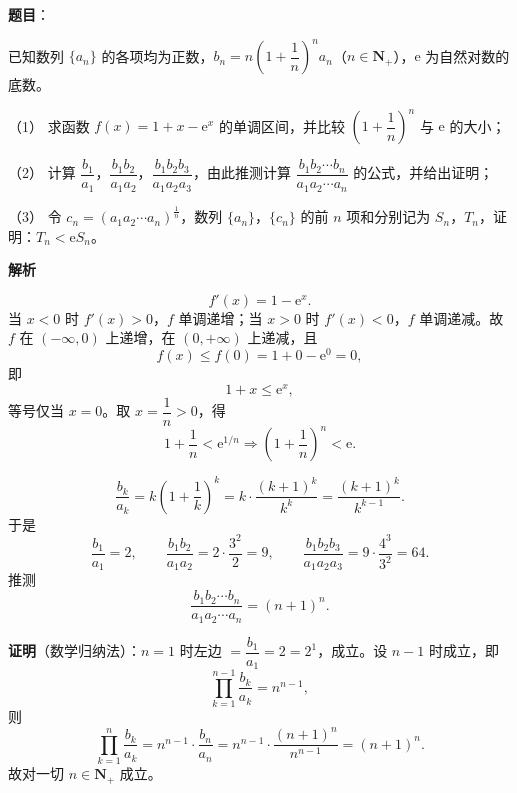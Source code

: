 \begin{answer}

\textbf{题目}：

已知数列 \(\{a_n\}\) 的各项均为正数，\(b_n=n\left(1+\dfrac{1}{n}\right)^n a_n\)（\(n\in\mathbf{N}_+\)），\(\mathrm{e}\) 为自然对数的底数。

（1） 求函数 \(f(x)=1+x-\mathrm{e}^x\) 的单调区间，并比较 \(\left(1+\dfrac{1}{n}\right)^n\) 与 \(\mathrm{e}\) 的大小；

（2） 计算 \(\dfrac{b_1}{a_1}\)，\(\dfrac{b_1b_2}{a_1a_2}\)，\(\dfrac{b_1b_2b_3}{a_1a_2a_3}\)，由此推测计算 \(\dfrac{b_1b_2\cdots b_n}{a_1a_2\cdots a_n}\) 的公式，并给出证明；

（3） 令 \(c_n=(a_1a_2\cdots a_n)^{\frac{1}{n}}\)，数列 \(\{a_n\}\)，\(\{c_n\}\) 的前 \(n\) 项和分别记为 \(S_n\)，\(T_n\)，证明：\(T_n<\mathrm{e}S_n\)。

\textbf{解析}


\nopagebreak[4]
\[
f'(x)=1-\mathrm{e}^x.
\]
当 \(x<0\) 时 \(f'(x)>0\)，\(f\) 单调递增；当 \(x>0\) 时 \(f'(x)<0\)，\(f\) 单调递减。故 \(f\) 在 \((-\infty,0)\) 上递增，在 \((0,+\infty)\) 上递减，且
\nopagebreak[4]
\[
f(x)\leqslant f(0)=1+0-\mathrm{e}^0=0,
\]
即
\nopagebreak[4]
\[
1+x\leqslant\mathrm{e}^x,
\]
等号仅当 \(x=0\)。取 \(x=\dfrac1n>0\)，得
\nopagebreak[4]
\[
1+\dfrac1n<\mathrm{e}^{1/n}
\Longrightarrow
\left(1+\dfrac1n\right)^n<\mathrm{e}.
\]


\nopagebreak[4]
\[
\dfrac{b_k}{a_k}
=k\left(1+\dfrac1k\right)^k
=k\cdot\dfrac{(k+1)^k}{k^k}
=\dfrac{(k+1)^k}{k^{k-1}}.
\]
于是
\nopagebreak[4]
\[
\dfrac{b_1}{a_1}=2,\qquad
\dfrac{b_1b_2}{a_1a_2}=2\cdot\dfrac{3^2}{2}=9,\qquad
\dfrac{b_1b_2b_3}{a_1a_2a_3}=9\cdot\dfrac{4^3}{3^2}=64.
\]
推测
\nopagebreak[4]
\[
\dfrac{b_1b_2\cdots b_n}{a_1a_2\cdots a_n}=(n+1)^n.
\]

\textbf{证明}（数学归纳法）：\(n=1\) 时左边 \(=\dfrac{b_1}{a_1}=2=2^1\)，成立。设 \(n-1\) 时成立，即
\nopagebreak[4]
\[
\prod_{k=1}^{n-1}\dfrac{b_k}{a_k}=n^{n-1},
\]
则
\nopagebreak[4]
\[
\prod_{k=1}^{n}\dfrac{b_k}{a_k}
=n^{n-1}\cdot\dfrac{b_n}{a_n}
=n^{n-1}\cdot\dfrac{(n+1)^n}{n^{n-1}}
=(n+1)^n.
\]
故对一切 \(n\in\mathbf{N}_+\) 成立。


\end{answer}
